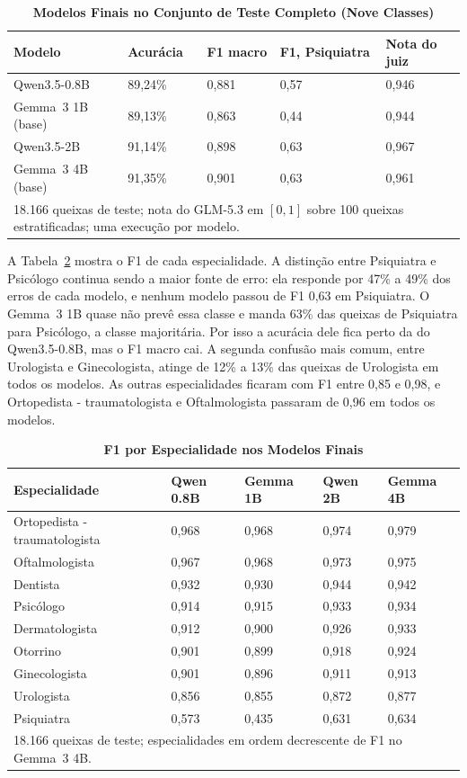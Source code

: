 \documentclass{ieeeaccess}
\begin{document}
\begin{table}[!t]
\caption{\textbf{Modelos Finais no Conjunto de Teste Completo (Nove Classes)}}
\label{tab:finais}
\setlength{\tabcolsep}{3pt}
\begin{tabular}{p{64pt}p{40pt}p{34pt}p{42pt}p{36pt}}
\hline
\textbf{Modelo} & \textbf{Acur\'acia} & \textbf{F1 macro} & \textbf{F1, Psiquiatra} & \textbf{Nota do juiz} \\
\hline
Qwen3.5-0.8B & 89,24\% & 0,881 & 0,57 & 0,946 \\
Gemma~3 1B (base) & 89,13\% & 0,863 & 0,44 & 0,944 \\
Qwen3.5-2B & 91,14\% & 0,898 & 0,63 & 0,967 \\
Gemma~3 4B (base) & 91,35\% & 0,901 & 0,63 & 0,961 \\
\hline
\multicolumn{5}{p{232pt}}{18.166 queixas de teste; nota do GLM-5.3 em $[0, 1]$ sobre 100 queixas estratificadas; uma execu\c{c}\~ao por modelo.}
\end{tabular}
\end{table}

A Tabela~\ref{tab:f1finais} mostra o F1 de cada especialidade. A distin\c{c}\~ao entre Psiquiatra e Psic\'ologo continua sendo a maior fonte de erro: ela responde por 47\% a 49\% dos erros de cada modelo, e nenhum modelo passou de F1 0,63 em Psiquiatra. O Gemma~3 1B quase n\~ao prev\^e essa classe e manda 63\% das queixas de Psiquiatra para Psic\'ologo, a classe majorit\'aria. Por isso a acur\'acia dele fica perto da do Qwen3.5-0.8B, mas o F1 macro cai. A segunda confus\~ao mais comum, entre Urologista e Ginecologista, atinge de 12\% a 13\% das queixas de Urologista em todos os modelos. As outras especialidades ficaram com F1 entre 0,85 e 0,98, e Ortopedista - traumatologista e Oftalmologista passaram de 0,96 em todos os modelos.

\begin{table}[!t]
\caption{\textbf{F1 por Especialidade nos Modelos Finais}}
\label{tab:f1finais}
\setlength{\tabcolsep}{3pt}
\begin{tabular}{p{82pt}p{32pt}p{32pt}p{32pt}p{32pt}}
\hline
\textbf{Especialidade} & \textbf{Qwen 0.8B} & \textbf{Gemma 1B} & \textbf{Qwen 2B} & \textbf{Gemma 4B} \\
\hline
Ortopedista - traumatologista & 0,968 & 0,968 & 0,974 & 0,979 \\
Oftalmologista & 0,967 & 0,968 & 0,973 & 0,975 \\
Dentista & 0,932 & 0,930 & 0,944 & 0,942 \\
Psic\'ologo & 0,914 & 0,915 & 0,933 & 0,934 \\
Dermatologista & 0,912 & 0,900 & 0,926 & 0,933 \\
Otorrino & 0,901 & 0,899 & 0,918 & 0,924 \\
Ginecologista & 0,901 & 0,896 & 0,911 & 0,913 \\
Urologista & 0,856 & 0,855 & 0,872 & 0,877 \\
Psiquiatra & 0,573 & 0,435 & 0,631 & 0,634 \\
\hline
\multicolumn{5}{p{232pt}}{18.166 queixas de teste; especialidades em ordem decrescente de F1 no Gemma~3 4B.}
\end{tabular}
\end{table}
\end{document}
